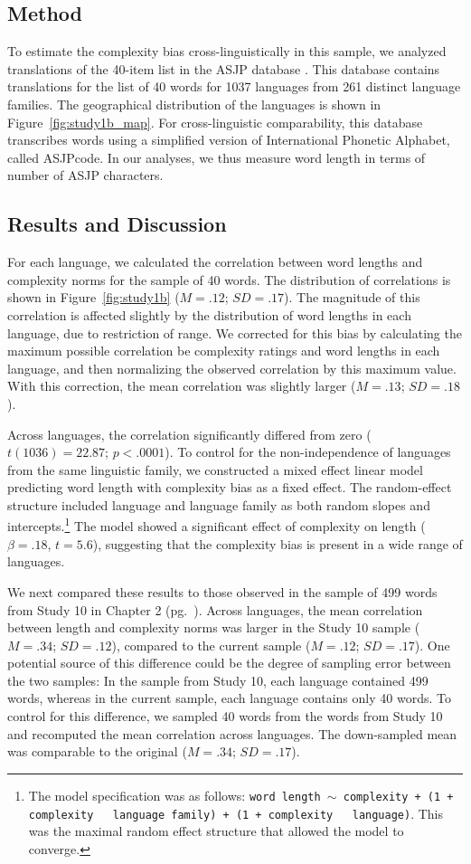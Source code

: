 \subsection{Method}
To estimate the complexity bias cross-linguistically in this sample, we analyzed translations of the 40-item list in the  ASJP database \cite{asjp}. This database contains translations for the list of 40 words for 1037 languages from 261 distinct language families. The geographical distribution of the languages is shown in Figure\ \ref{fig:study1b_map}. For cross-linguistic comparability, this database transcribes words using a simplified version of International Phonetic Alphabet, called ASJPcode. In our analyses, we thus measure word length in terms of number of ASJP characters.

\subsection{Results and Discussion}
For each language, we calculated the correlation between word lengths and complexity norms for the sample of 40 words. The distribution of correlations is shown in  
Figure\ \ref{fig:study1b} ($M = .12$; $SD = .17$). The magnitude of this correlation is affected slightly by the distribution of word lengths in each language, due to restriction of range. We corrected for this bias by calculating the maximum possible correlation be complexity ratings and word lengths in each language, and then normalizing the observed correlation by this maximum value. With this correction, the mean correlation was slightly larger ($M = .13$; $SD = .18$). 

Across languages,  the correlation significantly differed from zero ($ t(1036)= 22.87$; $p <.0001$).  To control for the non-independence of languages from the same linguistic family, we constructed a mixed effect linear model predicting word length with complexity bias as a fixed effect. The random-effect structure included language and language family as both random slopes and intercepts.\footnote{The model specification was as follows: \texttt{word length $\sim$ complexity + (1 + complexity ~\textbar~language family) +  (1 + complexity ~\textbar~language)}. This was the maximal random effect structure that allowed the model to converge.}  The model showed a significant effect of complexity on length ($\beta = .18$, $t = 5.6$), suggesting that the complexity bias is present in a wide range of languages.

We next compared these results to those observed in the sample of 499 words from Study 10 in Chapter 2 (pg.\ \pageref{ch2-10}). Across languages, the mean correlation between length and complexity norms was larger in the Study 10 sample ($M = .34$; $SD = .12$), compared to the current sample ($M = .12$; $SD = .17$). One potential source of this difference could be the degree of sampling error between the two samples: In the sample from Study 10, each language contained 499 words, whereas in the current sample, each language contains only 40 words. To control for this difference, we sampled 40 words from the words from Study 10 and recomputed  the mean correlation across languages. The down-sampled mean was comparable to the original  ($M = .34$; $SD = .17$). 

